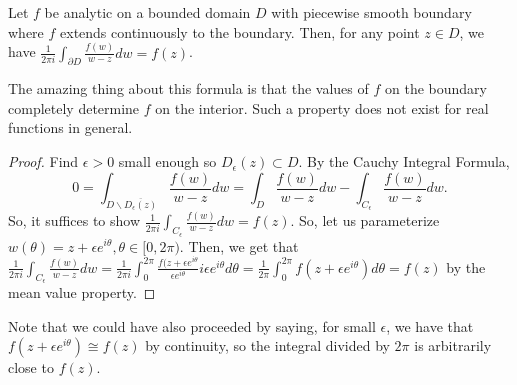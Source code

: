 \documentclass[11pt,leqno,oneside]{amsart}
\numberwithin{thm}{section}
\begin{document}
  \begin{thm}
    Let $f$ be analytic on a bounded domain $D$ with piecewise smooth
    boundary where $f$ extends continuously to the boundary. Then, for
    any point $z \in D$, we have $\frac{1}{2\pi i} \int_{\partial D}
    \frac{f(w)}{w-z}dw = f(z)$.
  \end{thm}
  The amazing thing about this formula is that the values of $f$ on
  the boundary completely determine $f$ on the interior. Such a
  property does not exist for real functions in general.
  \begin{proof}
    Find $\epsilon > 0$ small enough so $D_\epsilon(z) \subset D$. By
    the Cauchy Integral Formula,
    \[0 = \int_{D \smallsetminus \overline{D_\epsilon(z)}}
      \frac{f(w)}{w-z}dw = \int_D \frac{f(w)}{w-z}dw -
      \int_{C_\epsilon} \frac{f(w)}{w-z}dw.\]
    So, it suffices to show $\frac{1}{2 \pi i}\int_{C_\epsilon}
    \frac{f(w)}{w-z}dw = f(z)$. So, let us parameterize $w(\theta) =
    z+\epsilon e^{i\theta}, \theta \in [0,2 \pi)$. Then, we get that
    $\frac{1}{2 \pi i}\int_{C_\epsilon} \frac{f(w)}{w-z}dw =
    \frac{1}{2\pi i}\int_0^{2 \pi} \frac{f(z+\epsilon
      e^{i\theta}}{\epsilon e^{i\theta}} i \epsilon e^{i \theta}
    d\theta = \frac{1}{2\pi}\int_0^{2 \pi} f(z+\epsilon e^{i \theta})
    d \theta = f(z)$ by the mean value property.
  \end{proof}
  Note that we could have also proceeded by saying, for small
  $\epsilon$, we have that $f(z+\epsilon e^{i \theta}) \cong f(z)$ by
  continuity, so the integral divided by $2 \pi$ is arbitrarily close
  to $f(z)$.
\end{document}
